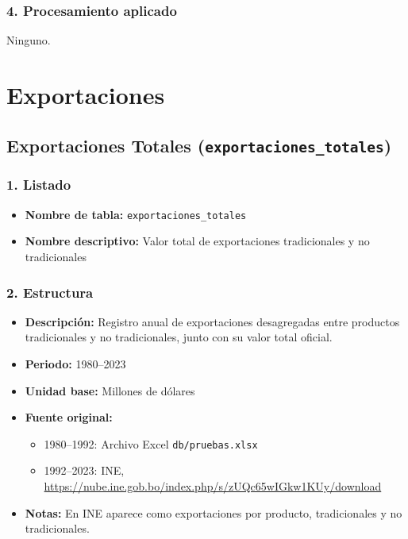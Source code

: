 \documentclass[12pt,a4paper]{article}
\begin{document}
\subsubsection*{4. Procesamiento aplicado}
Ninguno.



\newpage
\section{Exportaciones}
\subsection{Exportaciones Totales (\texttt{exportaciones\_totales})}

\subsubsection*{1. Listado}
\begin{itemize}
  \item \textbf{Nombre de tabla:} \texttt{exportaciones\_totales}
  \item \textbf{Nombre descriptivo:} Valor total de exportaciones tradicionales y no tradicionales
\end{itemize}

\subsubsection*{2. Estructura}
\begin{itemize}
  \item \textbf{Descripción:} Registro anual de exportaciones desagregadas entre productos tradicionales y no tradicionales, junto con su valor total oficial.
  \item \textbf{Periodo:} 1980--2023
  \item \textbf{Unidad base:} Millones de dólares
  \item \textbf{Fuente original:}
    \begin{itemize}
      \item 1980--1992: Archivo Excel \texttt{db/pruebas.xlsx}
      \item 1992--2023: INE, \url{https://nube.ine.gob.bo/index.php/s/zUQc65wIGkw1KUy/download}
    \end{itemize}
  \item \textbf{Notas:} En INE aparece como exportaciones por producto, tradicionales y no tradicionales.
\end{itemize}
\end{document}
